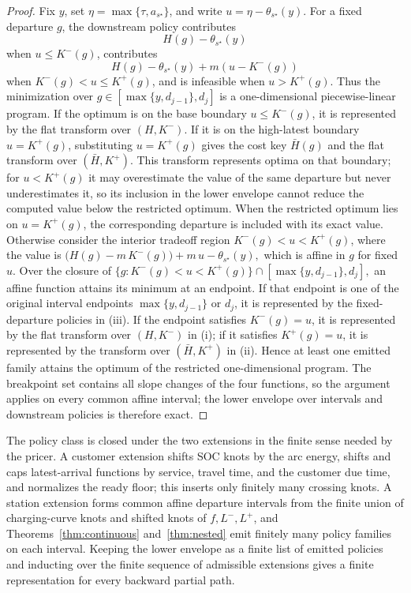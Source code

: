 \documentclass[review,3p,authoryear]{elsarticle}
\theoremstyle{plain}
\theoremstyle{definition}
\theoremstyle{remark}
\begin{document}
\begin{proof}
Fix \(y\), set \(\eta=\max\{\tau,a_{s^\star}\}\), and write
\(u=\eta-\theta_{s^\star}(y)\). For a fixed departure \(g\), the downstream policy contributes
\[
H(g)-\theta_{s^\star}(y)
\]
when $u\le K^-(g)$, contributes
\[
H(g)-\theta_{s^\star}(y)+m(u-K^-(g))
\]
when $K^-(g)<u\le K^+(g)$, and is infeasible when $u>K^+(g)$. Thus the minimization
over \(g\in[\max\{y,d_{j-1}\},d_j]\) is a one-dimensional piecewise-linear program.
If the optimum is on the base boundary $u\le K^-(g)$, it is represented by the flat
transform over $(H,K^-)$. If it is on the high-latest boundary $u=K^+(g)$, substituting
$u=K^+(g)$ gives the cost key $\bar H(g)$ and the flat transform over $(\bar H,K^+)$.
This transform represents optima on that boundary; for $u<K^+(g)$ it may overestimate
the value of the same departure but never underestimates it, so its inclusion in the
lower envelope cannot reduce the computed value below the restricted optimum. When the
restricted optimum lies on \(u=K^+(g)\), the corresponding departure is included with
its exact value. Otherwise consider the interior tradeoff region \(K^-(g)<u<K^+(g)\),
where the value is
$ \bigl(H(g)-m\,K^-(g)\bigr)+m\,u-\theta_{s^\star}(y),$ which is affine in \(g\) for fixed \(u\). Over the closure of
$ \{g:K^-(g)<u<K^+(g)\}\cap[\max\{y,d_{j-1}\},d_j],$
an affine function attains its minimum at an endpoint. If that endpoint is one of the
original interval endpoints \(\max\{y,d_{j-1}\}\) or \(d_j\), it is represented by the
fixed-departure policies in (iii). If the endpoint satisfies \(K^-(g)=u\), it is
represented by the flat transform over \((H,K^-)\) in (i); if it satisfies \(K^+(g)=u\),
it is represented by the transform over \((\bar H,K^+)\) in (ii). Hence at least one
emitted family attains the optimum of the restricted one-dimensional program. The
breakpoint set contains all slope changes of the four functions, so the argument applies
on every common affine interval; the lower envelope over intervals and downstream
policies is therefore exact.
\end{proof}

The policy class is closed under the two extensions in the finite sense needed by
the pricer. A customer extension shifts SOC knots by the arc energy, shifts and
caps latest-arrival functions by service, travel time, and the customer due time,
and normalizes the ready floor; this inserts only finitely many crossing knots. A
station extension forms common affine departure intervals from the finite union of
charging-curve knots and shifted knots of $f,L^-,L^+$, and
Theorems~\ref{thm:continuous} and~\ref{thm:nested} emit finitely many policy
families on each interval. Keeping the lower envelope
as a finite list of emitted policies and inducting over the finite sequence of
admissible extensions gives a finite representation for every backward partial path.
\end{document}
